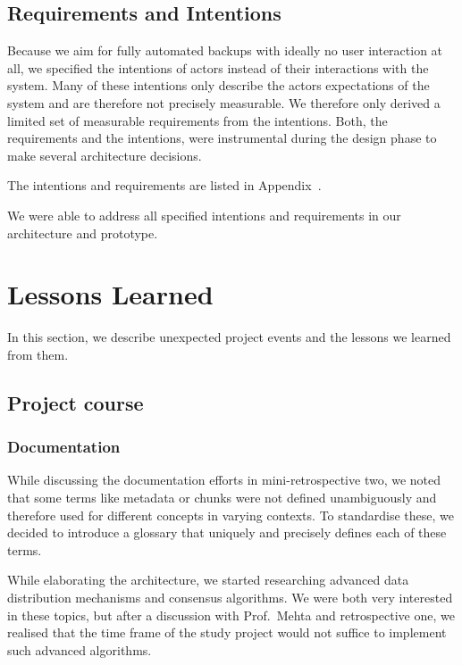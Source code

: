 \subsection{Requirements and Intentions}
Because we aim for fully automated backups with ideally no user interaction at all, we specified the intentions of actors instead of their interactions with the system. Many of these intentions only describe the actors expectations of the system and are therefore not precisely measurable. We therefore only derived a limited set of measurable requirements from the intentions. Both, the requirements and the intentions, were instrumental during the design phase to make several architecture decisions.

The intentions and requirements are listed in Appendix~.

We were able to address all specified intentions and requirements in our architecture and prototype.


\section{Lessons Learned}

In this section, we describe unexpected project events and the lessons we learned from them.

\subsection{Project course}
\subsubsection{Documentation}
While discussing the documentation efforts in mini-retrospective two, we noted that some terms like metadata or chunks were not defined unambiguously and therefore used for different concepts in varying contexts. To standardise these, we decided to introduce a glossary that uniquely and precisely defines each of these terms.

While elaborating the architecture, we started researching advanced data distribution mechanisms and consensus algorithms. We were both very interested in these topics, but after a discussion with Prof.~Mehta and retrospective one, we realised that the time frame of the study project would not suffice to implement such advanced algorithms.

